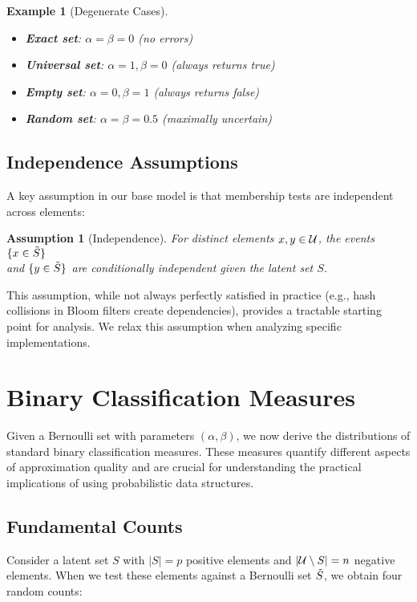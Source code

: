 \documentclass[11pt]{article}
\newtheorem{example}[theorem]{Example}
\newtheorem{assumption}[theorem]{Assumption}
\begin{document}
\begin{example}[Degenerate Cases]
\begin{itemize}
\item \textbf{Exact set}: $\alpha = \beta = 0$ (no errors)
\item \textbf{Universal set}: $\alpha = 1, \beta = 0$ (always returns true)
\item \textbf{Empty set}: $\alpha = 0, \beta = 1$ (always returns false)
\item \textbf{Random set}: $\alpha = \beta = 0.5$ (maximally uncertain)
\end{itemize}
\end{example}

\subsection{Independence Assumptions}

A key assumption in our base model is that membership tests are independent across elements:

\begin{assumption}[Independence]
For distinct elements $x, y \in \mathcal{U}$, the events $\{x \in \tilde{S}\}$\\ and $\{y \in \tilde{S}\}$ are conditionally independent given the latent set $S$.
\end{assumption}

This assumption, while not always perfectly satisfied in practice (e.g., hash collisions in Bloom filters create dependencies), provides a tractable starting point for analysis. We relax this assumption when analyzing specific implementations.

\section{Binary Classification Measures}
\label{sec:measures}

Given a Bernoulli set with parameters $(\alpha, \beta)$, we now derive the distributions of standard binary classification measures. These measures quantify different aspects of approximation quality and are crucial for understanding the practical implications of using probabilistic data structures.

\subsection{Fundamental Counts}

Consider a latent set $S$ with $|S| = p$ positive elements and $|\mathcal{U} \setminus S| = n$ negative elements. When we test these elements against a Bernoulli set $\tilde{S}$, we obtain four random counts:
\end{document}
